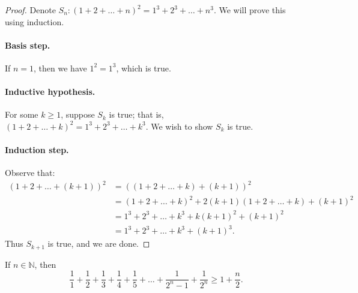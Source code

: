 \documentclass{exam}
\begin{document}
\begin{proof}
    Denote $S_n:(1+2+\dots+n)^2=1^3+2^3+\dots+n^3$. We will prove this using induction.
    
    \paragraph{Basis step.} If $n = 1$, then we have $1^2=1^3$, which is true.

    \paragraph{Inductive hypothesis.} For some $k\ge 1$, suppose $S_k$ is true; that is, $(1+2+\dots+k)^2=1^3+2^3 + \dots+k^3$. We wish to show $S_k$ is true.

    \paragraph{Induction step.} Observe that:
    \begin{align*}
        (1+2+\dots+(k+1))^2 &= ((1+2+\dots+k)+(k+1))^2\\
        &=(1+2+\dots+k)^2+2(k+1)(1+2+\dots+k)+(k+1)^2\\
        &=1^3+2^3+\dots+k^3+k(k+1)^2 + (k+1)^2 \tag{Prop. 10.1}\\
        &=1^3+2^3+\dots+k^3+(k+1)^3.
    \end{align*}
    Thus $S_{k+1}$ is true, and we are done.
\end{proof}

\begin{proposition}{10.21}
    If $n\in\mathbb N$, then $$\frac11+\frac12+\frac13+\frac14+\frac15+\dots+\frac1{2^n-1}+\frac1{2^n}\ge1+\frac{n}2.$$
\end{proposition}
\end{document}
